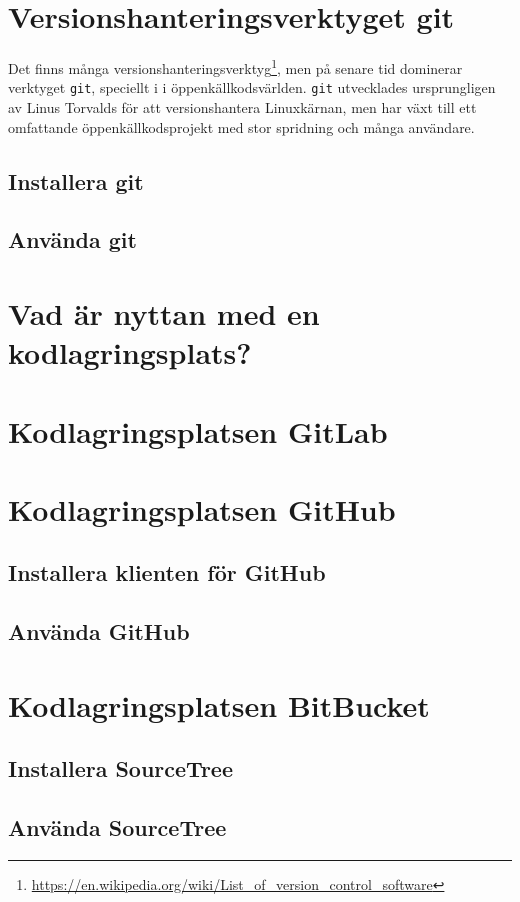 \section{Versionshanteringsverktyget git}

Det finns många versionshanteringsverktyg\footnote{\href{https://en.wikipedia.org/wiki/List_of_version_control_software}{https://en.wikipedia.org/wiki/List\_of\_version\_control\_software}}, men på senare tid dominerar verktyget \texttt{git}, speciellt i i öppenkällkodsvärlden. \texttt{git} utvecklades ursprungligen av Linus Torvalds för att versionshantera Linuxkärnan, men har växt till ett omfattande öppenkällkodsprojekt med stor spridning och många användare.



\subsection{Installera git}

\subsection{Använda git}

\section{Vad är nyttan med en kodlagringsplats?}

\section{Kodlagringsplatsen GitLab}


\section{Kodlagringsplatsen GitHub}

\subsection{Installera klienten för GitHub}

\subsection{Använda GitHub}


\section{Kodlagringsplatsen BitBucket}

\subsection{Installera SourceTree}

\subsection{Använda SourceTree}
